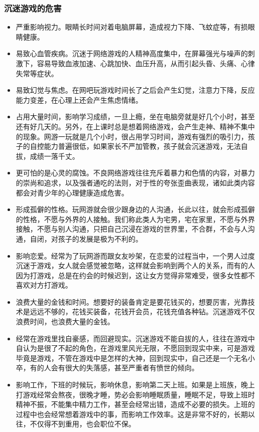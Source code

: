 \subsubsection{沉迷游戏的危害}

\begin{itemize}
    \item 严重影响视力。眼睛长时间对着电脑屏幕，造成视力下降、飞蚊症等，有损眼睛健康。
    \item 易致心血管疾病。沉迷于网络游戏的人精神高度集中，在屏幕强光与噪声的刺激下，容易导致血液加速、心跳加快、血压升高，从而引起头昏、头痛、心律失常等症状。
    \item 易致幻觉与焦虑。在网吧玩游戏时间长了之后会产生幻觉，注意力下降，反应能力变差，在心理上还会产生焦虑情绪。
    \item 占用大量时间，影响学习成绩，一旦上瘾，坐在电脑旁就是好几个小时，甚至还有好几天的。另外，在上课时总是想着网络游戏，会产生走神、精神不集中的现象。网游一玩就是几个小时，很占用学习时间，游戏有强烈的吸引力，孩子的自控能力普遍很低，如果家长不严加管教，孩子就会沉迷游戏，无法自拔，成绩一落千丈。
    \item 更可怕的是心灵的腐蚀。不良网络游戏往往充斥着暴力和色情的内容，对暴力的崇尚和追求，以及强者通吃的法则，对于性的夸张歪曲表现，诸如此类内容都会对青少年的心理健康造成危害。
    \item 形成孤僻的性格。玩网游就会很少跟身边的人沟通，长此以往，就会形成孤僻的性格，不愿与外界的人接触。我们称此类人为宅男，宅在家里，不愿与外界接触，不愿与别人沟通，只把自己沉浸在游戏的世界里，不合群，不会与人沟通，自闭，对孩子的发展是极为不利的。
    \item 影响恋爱。经常为了玩网游而跟女友吵架，在恋爱的过程当中，一个男人过度沉迷于游戏，女人就会感觉被忽略，这样就会影响到两个人的关系，而有的人因为打游戏，总是在约会的时候迟到，这让女方觉得非常难受，很多女性都不喜欢对方打游戏。
    \item 浪费大量的金钱和时间。想要好的装备肯定是要花钱买的，想要厉害，光靠技术是远远不够的，花钱买装备，花钱开会员，花钱充值各种钻。沉迷游戏不仅浪费时间，也浪费大量的金钱。
    \item 经常在游戏里找自豪感，而回避现实。沉迷游戏不能自拔的人，往往在游戏中自认为是很了不起的角色，在游戏里风光无限，不愿回到现实中来，可是游戏毕竟是游戏，不管在游戏中是怎样的大神，回到现实中，自己还是一个无名小卒，有的人会有很大的失落感，甚至严重者有愤世的倾向。
    \item 影响工作，下班的时候玩，影响休息，影响第二天上班。如果是上班族，晚上打游戏经常会熬夜，很晚才睡，势必会影响睡眠质量，睡眠不足，导致上班时精神不振，不能集中精力工作，甚至会经常出错，造成不必要的损失。上班的过程中也会经常想着游戏中的事，而影响工作效率。这是非常不好的，长期以往，不仅得不到重用，也会职位不保。

\end{itemize}
